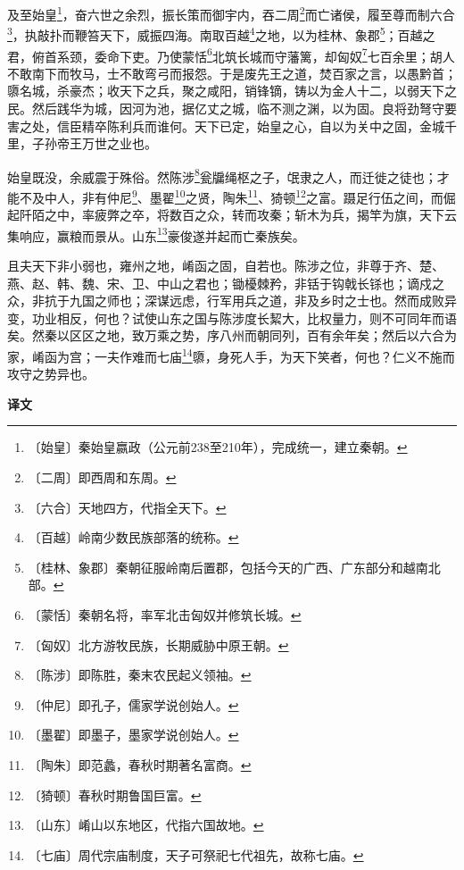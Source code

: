 \documentclass[12pt,UTF-8,openany,a4]{ctexbook}
\begin{document}
\begin{large}
    及至始皇\footnote{〔始皇〕\yiwen 秦始皇嬴政（公元前238至210年），完成统一，建立秦朝。}，奋六世之余烈，振长策而御宇内，吞二周\footnote{〔二周〕\yiwen 即西周和东周。}而亡诸侯，履至尊而制六合\footnote{〔六合〕\yiwen 天地四方，代指全天下。}，执敲扑而鞭笞天下，威振四海。南取百越\footnote{〔百越〕\yiwen 岭南少数民族部落的统称。}之地，以为桂林、象郡\footnote{〔桂林、象郡〕\yiwen 秦朝征服岭南后置郡，包括今天的广西、广东部分和越南北部。}；百越之君，俯首系颈，委命下吏。乃使蒙恬\footnote{〔蒙恬〕\yiwen 秦朝名将，率军北击匈奴并修筑长城。}北筑长城而守藩篱，却匈奴\footnote{〔匈奴〕\yiwen 北方游牧民族，长期威胁中原王朝。}七百余里；胡人不敢南下而牧马，士不敢弯弓而报怨。于是废先王之道，焚百家之言，以愚黔首；隳名城，杀豪杰；收天下之兵，聚之咸阳，销锋镝，铸以为金人十二，以弱天下之民。然后践华为城，因河为池，据亿丈之城，临不测之渊，以为固。良将劲弩守要害之处，信臣精卒陈利兵而谁何。天下已定，始皇之心，自以为关中之固，金城千里，子孙帝王万世之业也。
    
    始皇既没，余威震于殊俗。然陈涉\footnote{〔陈涉〕\yiwen 即陈胜，秦末农民起义领袖。}瓮牖绳枢之子，氓隶之人，而迁徙之徒也；才能不及中人，非有仲尼\footnote{〔仲尼〕\yiwen 即孔子，儒家学说创始人。}、墨翟\footnote{〔墨翟〕\yiwen 即墨子，墨家学说创始人。}之贤，陶朱\footnote{〔陶朱〕\yiwen 即范蠡，春秋时期著名富商。}、猗顿\footnote{〔猗顿〕\yiwen 春秋时期鲁国巨富。}之富。蹑足行伍之间，而倔起阡陌之中，率疲弊之卒，将数百之众，转而攻秦；斩木为兵，揭竿为旗，天下云集响应，赢粮而景从。山东\footnote{〔山东〕\yiwen 崤山以东地区，代指六国故地。}豪俊遂并起而亡秦族矣。
    
    且夫天下非小弱也，雍州之地，崤函之固，自若也。陈涉之位，非尊于齐、楚、燕、赵、韩、魏、宋、卫、中山之君也；锄櫌棘矜，非铦于钩戟长铩也；谪戍之众，非抗于九国之师也；深谋远虑，行军用兵之道，非及乡时之士也。然而成败异变，功业相反，何也？试使山东之国与陈涉度长絜大，比权量力，则不可同年而语矣。然秦以区区之地，致万乘之势，序八州而朝同列，百有余年矣；然后以六合为家，崤函为宫；一夫作难而七庙\footnote{〔七庙〕\yiwen 周代宗庙制度，天子可祭祀七代祖先，故称七庙。}隳，身死人手，为天下笑者，何也？仁义不施而攻守之势异也。
\end{large}


\newpage

\begin{Large}
    \noindent\textbf{译文}
\end{Large}


\vspace{1em}
\end{document}
